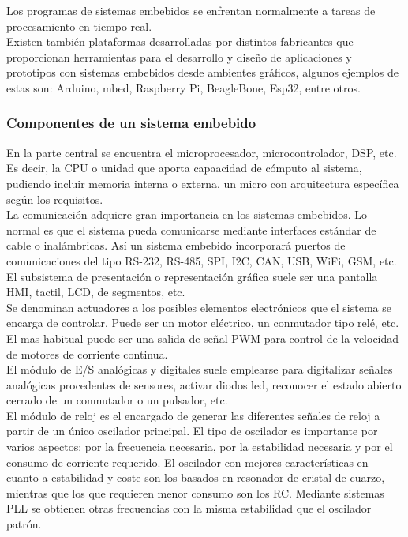 \documentclass[12pt,titlepage]{article}
\begin{document}
Los programas de sistemas embebidos se enfrentan normalmente a tareas de procesamiento en tiempo real. \\[2.8mm]
Existen también plataformas desarrolladas por distintos fabricantes que proporcionan herramientas para el desarrollo y diseño de aplicaciones y prototipos con sistemas embebidos desde ambientes gráficos, algunos ejemplos de estas son: Arduino, mbed, Raspberry Pi, BeagleBone, Esp32, entre otros. 
\subsubsection{Componentes de un sistema embebido}
En la parte central se encuentra el microprocesador, microcontrolador, DSP, etc. Es decir, la CPU o unidad que aporta capaacidad de cómputo al sistema, pudiendo incluir memoria interna o externa, un micro con arquitectura específica según los requisitos.\\[2.8mm]
La comunicación adquiere gran importancia en los sistemas embebidos. Lo normal es que el sistema pueda comunicarse mediante interfaces estándar de cable o inalámbricas. Así un sistema embebido incorporará puertos de comunicaciones del tipo RS-232, RS-485, SPI, I2C, CAN, USB, WiFi, GSM, etc. \\[9.8mm]

El subsistema de presentación o representación gráfica suele ser una pantalla HMI, tactil, LCD, de segmentos, etc. \\[1.2mm]

Se denominan actuadores a los posibles elementos electrónicos que el sistema se encarga de controlar. Puede ser un motor eléctrico, un conmutador tipo relé, etc. El mas habitual puede ser una salida de señal PWM para control de la velocidad de motores de corriente continua. \\[0.8mm]

El módulo de E/S analógicas y digitales suele emplearse para digitalizar señales analógicas procedentes de sensores, activar diodos led, reconocer el estado abierto cerrado de un conmutador o un pulsador, etc. \\[0.8mm]

El módulo de reloj es el encargado de generar las diferentes señales de reloj a partir de un único oscilador principal. El tipo de oscilador es importante por varios aspectos: por la frecuencia necesaria, por la estabilidad necesaria y por el consumo de corriente requerido. El oscilador con mejores características en cuanto a estabilidad y coste son los basados en resonador de cristal de cuarzo, mientras que los que requieren menor consumo son los RC. Mediante sistemas PLL se obtienen otras frecuencias con la misma estabilidad que el oscilador patrón.\\[0.8mm]
\end{document}
